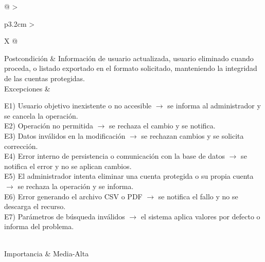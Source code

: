 \begin{table}[]
\begin{tabularx}{\textwidth}{@{}
			>{\raggedright\arraybackslash}p{3.2cm}
			>{\raggedright\arraybackslash}X
			@{}}
		Postcondición &
		Información de usuario actualizada, usuario eliminado cuando proceda, o listado exportado en el formato solicitado, manteniendo la integridad de las cuentas protegidas. \\
		
		Excepciones &
		\begin{minipage}[t]{\linewidth}
			\vspace{-\baselineskip}
			E1) Usuario objetivo inexistente o no accesible $\rightarrow$ se informa al administrador y se cancela la operación.\\
			E2) Operación no permitida $\rightarrow$ se rechaza el cambio y se notifica.\\
			E3) Datos inválidos en la modificación $\rightarrow$ se rechazan cambios y se solicita corrección.\\
			E4) Error interno de persistencia o comunicación con la base de datos $\rightarrow$ se notifica el error y no se aplican cambios.\\
			E5) El administrador intenta eliminar una cuenta protegida o su propia cuenta $\rightarrow$ se rechaza la operación y se informa.\\
			E6) Error generando el archivo CSV o PDF $\rightarrow$ se notifica el fallo y no se descarga el recurso.\\
			E7) Parámetros de búsqueda inválidos $\rightarrow$ el sistema aplica valores por defecto o informa del problema.
		\end{minipage} \\
		
		Importancia &
		Media-Alta \\
		\bottomrule
	\end{tabularx}
\end{table}



